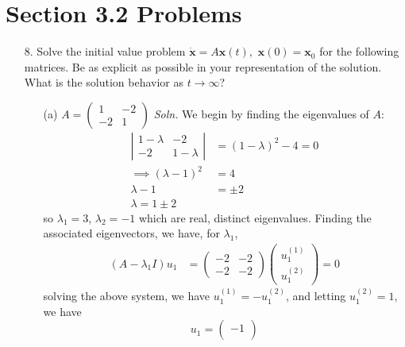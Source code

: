 \documentclass{article}
\begin{document}
\section*{Section 3.2 Problems}
\begin{itemize}
    \item[8.] Solve the initial value problem $\dot{\mathbf{x}} = A\mathbf{x}(t),$ $\mathbf{x}(0) = \mathbf{x}_0$ for the following matrices. Be as explicit as possible in your representation of the solution. What is the solution behavior as $t \to \infty$?
    \begin{itemize}
        \item[(a)] $A = \begin{pmatrix}
            1 & -2\\
            -2 & 1
        \end{pmatrix}$
        \newline\newline
        \textit{Soln.} We begin by finding the eigenvalues of $A$:
        \begin{align*}
            \left|\begin{matrix}
                1 - \lambda & -2\\
                -2 & 1 - \lambda
            \end{matrix}\right| &= (1 - \lambda)^2 - 4 = 0\\
            \implies (\lambda - 1)^2 &= 4\\
            \lambda - 1 &= \pm 2\\
            \lambda = 1 \pm 2
        \end{align*}
        so $\lambda_1 = 3$, $\lambda_2 = -1$ which are real, distinct eigenvalues. Finding the associated eigenvectors, we have, for $\lambda_1$,
        \begin{align*}
            (A - \lambda_1I)u_1 &= \begin{pmatrix}
                -2 & -2\\
                -2 & -2
            \end{pmatrix}\begin{pmatrix}
                u_1^{(1)}\\
                u_1^{(2)}
            \end{pmatrix} = 0
        \end{align*}
        solving the above system, we have $u_1^{(1)} = -u_1^{(2)}$, and letting $u_1^{(2)} = 1$, we have
        \[u_1 = \begin{pmatrix}
            -1\\

\end{pmatrix}\]
\end{itemize}
\end{itemize}
\end{document}
